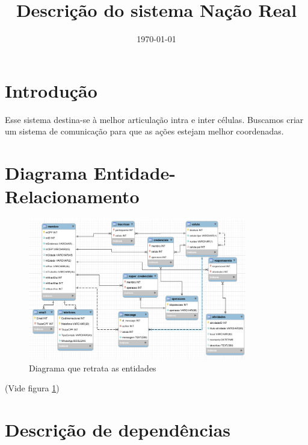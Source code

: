 \documentclass[11pt]{article}
\title{Descrição do sistema Nação Real}
\date{\today}
\begin{document}
    \maketitle
    \tableofcontents
    \listoffigures
    \newpage

    \section{Introdução}
    \label{s-intro}

    Esse sistema destina-se à melhor articulação intra e inter células. Buscamos criar um sistema de comunicação para
    que as ações estejam melhor coordenadas.

    \section[DER]{Diagrama Entidade-Relacionamento}
    \label{DER}

    \begin{figure}
        \centering
        \includegraphics[width=0.85\textwidth]{bd.png}
        \caption{Diagrama que retrata as entidades}
        \label{fig:der}
    \end{figure}

    (Vide figura \ref{fig:der})

    \section[Dependências]{Descrição de dependências}
\end{document}
